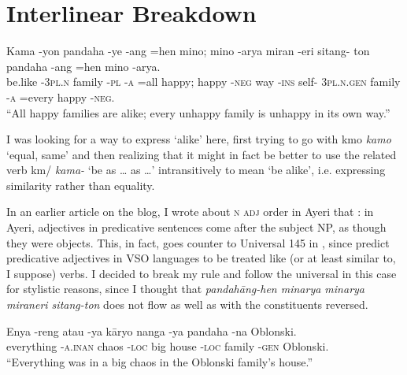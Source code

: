 \documentclass[12pt,paper=letter]{scrartcl}
\newcommand{\fw}[1]{\textit{#1}} %
\newcommand{\q}[1]{\enquote{#1}} %
\newcommand{\qq}[1]{\enquote*{#1}} %
\newcommand{\divider}{
    \vspace{\baselineskip}
}
\newcommand{\mor}[1]{\textsc{\lowercase{#1}}}
\newcommand{\ayr}[1]{{\Tagati #1}}
\begin{document}
\section{Interlinear Breakdown}

\begin{exe} %
    \ex \label{ex:1}
    \gll Kama -yon pandaha -ye -ang =hen mino; mino -arya miran -eri sitang- ton 
	pandaha -ang =hen mino -arya. \\
    be.like \mor{-3PL.N} family \mor{-PL} \mor{-A} =all happy; happy \mor{-NEG} 
	way \mor{-INS} self- \mor{3PL.N.GEN} family \mor{-A} =every happy
	\mor{-NEG}. \\
    \glt \q{All happy families are alike; every unhappy family is unhappy 
	in its own way.}
\end{exe}

I was looking for a way to express \qq{alike} here, first trying to go with
\ayr{kmo} \fw{kamo} \qq{equal, same} and then realizing that it might in fact
be better to use the related verb \ayr{km/} \fw{kama-} \qq{be as … as …}
intransitively to mean \qq{be alike}, i.e. expressing similarity rather than 
equality.

In an earlier article on the blog, I wrote about \mor{N ADJ} order in Ayeri that
: in Ayeri, adjectives in predicative sentences come after
the subject NP, as though they were objects. This, in fact, goes counter to 
Universal 145 in  \autocite{universalsarchive},
since \citeauthor{universalsarchive} predict predicative adjectives in VSO 
languages to be treated like (or at least similar to, I suppose) verbs. I 
decided to break my rule and follow the universal in this case for stylistic 
reasons, since I thought that \fw{pandahāng-hen minarya minarya miraneri 
sitang-ton} does not flow as well as with the constituents reversed.

\divider

\begin{exe} %
    \ex
    \gll Enya -reng atau -ya kāryo nanga -ya pandaha -na Oblonski. \\
    everything \mor{-A.INAN} chaos \mor{-LOC} big house \mor{-LOC} family 
	\mor{-GEN} Oblonski. \\
    \glt \q{Everything was in a big chaos in the Oblonski family's house.}
\end{exe}
\end{document}

